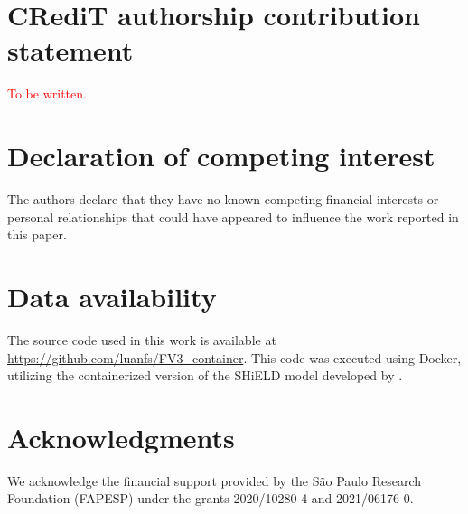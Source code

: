 \documentclass[preprint,12pt]{elsarticle}
\begin{document}
\begin{linenumbers}
\section*{CRediT authorship contribution statement}
\textcolor{red}{To be written.}

\section*{Declaration of competing interest}
The authors declare that they have no known competing financial interests or personal relationships that could have appeared to influence the work reported in this paper.

\section*{Data availability}
The source code used in this work is available at \url{https://github.com/luanfs/FV3_container}.
This code was executed using Docker, utilizing the containerized
version of the SHiELD model developed by \cite{cheng:2022}.

\section*{Acknowledgments}
We acknowledge the financial support provided by the São Paulo Research Foundation (FAPESP) under the grants 2020/10280-4 and 2021/06176-0.



\appendix

\end{linenumbers}
\end{document}
